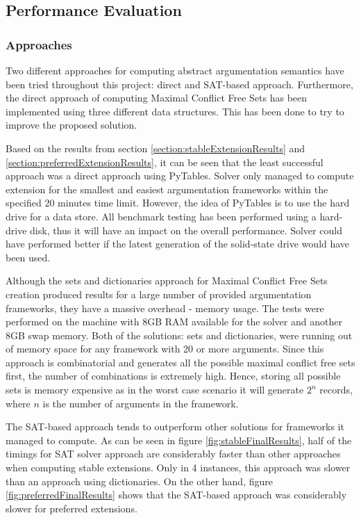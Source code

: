 \subsection{Performance Evaluation}

\subsubsection{Approaches} 
Two different approaches for computing abstract argumentation semantics have been tried throughout this project: direct and SAT-based approach. Furthermore, the direct approach of computing Maximal Conflict Free Sets has been implemented using three different data structures. This has been done to try to improve the proposed solution. 

Based on the results from section \ref{section:stableExtensionResults} and \ref{section:preferredExtensionResults}, it can be seen that the least successful approach was a direct approach using PyTables. Solver only managed to compute extension for the smallest and easiest argumentation frameworks within the specified 20 minutes time limit. However, the idea of PyTables is to use the hard drive for a data store. All benchmark testing has been performed using a hard-drive disk, thus it will have an impact on the overall performance. Solver could have performed better if the latest generation of the solid-state drive would have been used. 

Although the sets and dictionaries approach for Maximal Conflict Free Sets creation produced results for a large number of provided argumentation frameworks, they have a massive overhead - memory usage. The tests were performed on the machine with 8GB RAM available for the solver and another 8GB swap memory. Both of the solutions: sets and dictionaries, were running out of memory space for any framework with 20 or more arguments. Since this approach is combinatorial and generates all the possible maximal conflict free sets first, the number of combinations is extremely high. Hence, storing all possible sets is memory expensive as in the worst case scenario it will generate $2^n$ records, where $n$ is the number of arguments in the framework.

The SAT-based approach tends to outperform other solutions for frameworks it managed to compute. As can be seen in figure \ref{fig:stableFinalResults}, half of the timings for SAT solver approach are considerably faster than other approaches when computing stable extensions. Only in 4 instances, this approach was slower than an approach using dictionaries. On the other hand, figure \ref{fig:preferredFinalResults} shows that the SAT-based approach was considerably slower for preferred extensions. 


